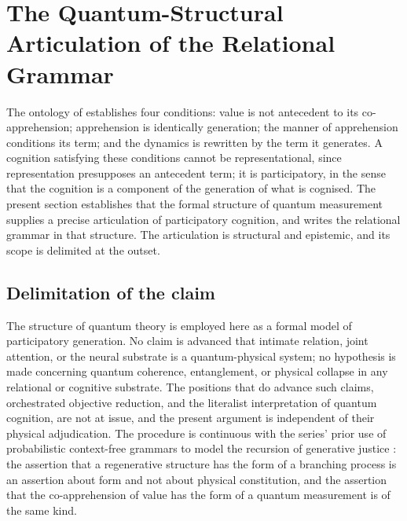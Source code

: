 \section{The Quantum-Structural Articulation of the Relational Grammar}
\label{p10:sec:grammar}

\noindent
The ontology of  establishes four conditions: value is not antecedent to its co-apprehension; apprehension is identically generation; the manner of apprehension conditions its term; and the dynamics is rewritten by the term it generates. A cognition satisfying these conditions cannot be representational, since representation presupposes an antecedent term; it is participatory, in the sense that the cognition is a component of the generation of what is cognised. The present section establishes that the formal structure of quantum measurement supplies a precise articulation of participatory cognition, and writes the relational grammar in that structure. The articulation is structural and epistemic, and its scope is delimited at the outset.

\subsection{Delimitation of the claim}
\label{p10:sec:self-limit}

The structure of quantum theory is employed here as a formal model of participatory generation. No claim is advanced that intimate relation, joint attention, or the neural substrate is a quantum-physical system; no hypothesis is made concerning quantum coherence, entanglement, or physical collapse in any relational or cognitive substrate. The positions that do advance such claims, orchestrated objective reduction, and the literalist interpretation of quantum cognition, are not at issue, and the present argument is independent of their physical adjudication. The procedure is continuous with the series' prior use of probabilistic context-free grammars to model the recursion of generative justice \parencite{eglash2016,eglash1999}: the assertion that a regenerative structure has the form of a branching process is an assertion about form and not about physical constitution, and the assertion that the co-apprehension of value has the form of a quantum measurement is of the same kind.

